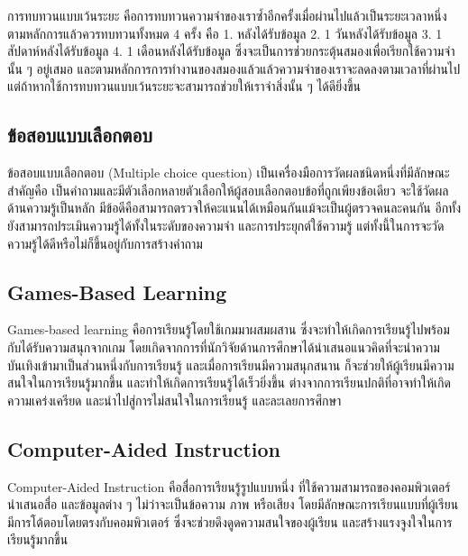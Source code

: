 \documentclass[12pt,oneside,openright,a4paper]{cpe-thai-project}
\begin{document}
\hspace{1cm}
การทบทวนแบบเว้นระยะ \cite{SpacedRepetition} คือการทบทวนความจำของเราซ้ำอีกครั้งเมื่อผ่านไปแล้วเป็นระยะเวลาหนึ่ง ตามหลักการแล้วควรทบทวนทั้งหมด 4 ครั้ง คือ
1. หลังได้รับข้อมูล 2. 1 วันหลังได้รับข้อมูล 3. 1 สัปดาห์หลังได้รับข้อมูล 4. 1 เดือนหลังได้รับข้อมูล
ซึ่งจะเป็นการช่วยกระตุ้นสมองเพื่อเรียกใช้ความจำนั้น ๆ อยู่เสมอ และตามหลักการการทำงานของสมองแล้วแล้วความจำของเราจะลดลงตามเวลาที่ผ่านไป
แต่ถ้าหากใช้การทบทวนแบบเว้นระยะจะสามารถช่วยให้เราจำสิ่งนั้น ๆ ได้ดียิ่งขึ้น

\subsection{ข้อสอบแบบเลือกตอบ}

\hspace{1cm}
ข้อสอบแบบเลือกตอบ (Multiple choice question) \cite{MultiChoices} เป็นเครื่องมือการวัดผลชนิดหนึ่งที่มีลักษณะสำคัญคือ
เป็นคำถามและมีตัวเลือกหลายตัวเลือกให้ผู้สอบเลือกตอบข้อที่ถูกเพียงข้อเดียว จะใช้วัดผลด้านความรู้เป็นหลัก
มีข้อดีคือสามารถตรวจให้คะแนนได้เหมือนกันแม้จะเป็นผู้ตรวจคนละคนกัน อีกทั้งยังสามารถประเมินความรู้ได้ทั้งในระดับของความจำ
และการประยุกต์ใช้ความรู้ แต่ทั้งนี้ในการจะวัดความรู้ได้ดีหรือไม่ก็ขึ้นอยู่กับการสร้างคำถาม

\subsection{Games-Based Learning}

\hspace{1cm}
Games-based learning \cite{GBL} คือการเรียนรู้โดยใช้เกมมาผสมผสาน ซึ่งจะทำให้เกิดการเรียนรู้ไปพร้อมกับได้รับความสนุกจากเกม
โดยเกิดจากการที่นักวิจัยด้านการศึกษาได้นำเสนอแนวคิดที่จะนำความบันเทิงเข้ามาเป็นส่วนหนึ่งกับการเรียนรู้ และเมื่อการเรียนมีความสนุกสนาน
ก็จะช่วยให้ผู้เรียนมีความสนใจในการเรียนรู้มากขึ้น และทำให้เกิดการเรียนรู้ได้เร็วยิ่งขึ้น ต่างจากการเรียนปกติที่อาจทำให้เกิดความเคร่งเครียด
และนำไปสู่การไม่สนใจในการเรียนรู้ และละเลยการศึกษา

\subsection{Computer-Aided Instruction}

\hspace{1cm}
Computer-Aided Instruction \cite{CAI1,CAI2} คือสื่อการเรียนรู้รูปแบบหนึ่ง ที่ใช้ความสามารถของคอมพิวเตอร์นำเสนอสื่อ และข้อมูลต่าง ๆ
ไม่ว่าจะเป็นข้อความ ภาพ หรือเสียง โดยมีลักษณะการเรียนแบบที่ผู้เรียนมีการโต้ตอบโดยตรงกับคอมพิวเตอร์
ซึ่งจะช่วยดึงดูดความสนใจของผู้เรียน และสร้างแรงจูงใจในการเรียนรู้มากขึ้น
\end{document}

